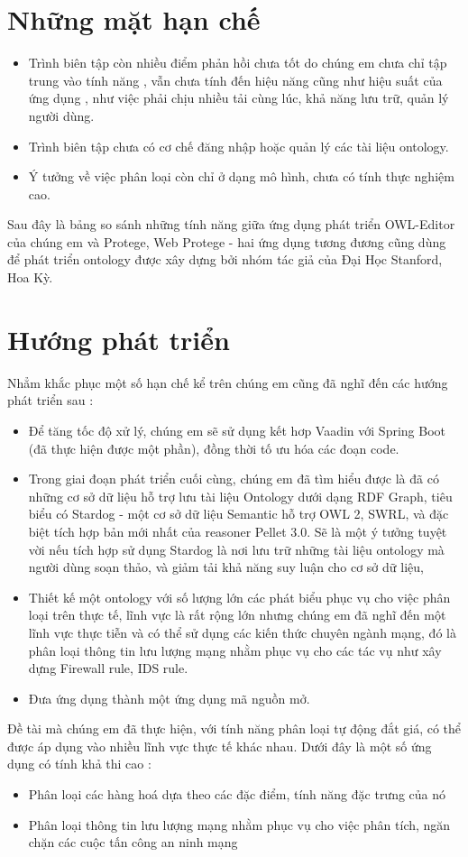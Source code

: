 \section{Những mặt hạn chế}
\begin{itemize}
\item Trình biên tập còn nhiều điểm phản hồi chưa tốt do chúng em chưa chỉ tập trung vào tính năng , vẫn chưa tính đến hiệu năng cũng như hiệu suất của ứng dụng , như việc phải chịu nhiều tải cùng lúc, khả năng lưu trữ, quản lý người dùng.
\item Trình biên tập chưa có cơ chế đăng nhập hoặc quản lý các tài liệu ontology.
\item Ý tưởng về việc phân loại còn chỉ ở dạng mô hình, chưa có tính thực nghiệm cao.
\end{itemize}
Sau đây là bảng so sánh những tính năng giữa ứng dụng phát triển OWL-Editor của chúng em và Protege, Web Protege - hai ứng dụng tương đương cũng dùng để phát triển ontology được xây dựng bởi nhóm tác giả của Đại Học Stanford, Hoa Kỳ.



\section{Hướng phát triển}
Nhẳm khắc phục một số hạn chế kể trên chúng em cũng đã nghĩ đến các hướng phát triển sau :
\begin{itemize}
\item Để tăng tốc độ xử lý, chúng em sẽ sử dụng kết hơp Vaadin với Spring Boot (đã thực hiện được một phần), đồng thời tố ưu hóa các đoạn code.
\item Trong giai đoạn phát triển cuối cùng, chúng em đã tìm hiểu được là đã có những cơ sở dữ liệu hỗ trợ lưu tài liệu Ontology dưới dạng RDF Graph, tiêu biểu có Stardog - một cơ sở dữ liệu Semantic hỗ trợ OWL 2, SWRL, và đặc biệt tích hợp bản mới nhất của reasoner Pellet 3.0. Sẽ là một ý tưởng tuyệt vời nếu tích hợp sử dụng Stardog là nơi lưu trữ những tài liệu ontology mà người dùng soạn thảo, và giảm tải khả năng suy luận cho cơ sở dữ liệu,
\item Thiết kế một ontology với số lượng lớn các phát biểu phục vụ cho việc phân loại trên thực tế, lĩnh vực là rất rộng lớn nhưng chúng em đã nghĩ đến một lĩnh vực thực tiễn và có thể sử dụng các kiến thức chuyên ngành mạng, đó là phân loại thông tin lưu lượng mạng nhằm phục vụ cho các tác vụ như xây dựng Firewall rule, IDS rule.
\item Đưa ứng dụng thành một ứng dụng mã nguồn mở.
\end{itemize}

Đề tài mà chúng em đã thực hiện, với tính năng phân loại tự động đắt giá, có thể được áp dụng vào nhiều lĩnh vực thực tế khác nhau. Dưới đây là một số ứng dụng có tính khả thi cao :
\begin{itemize}
\item Phân loại các hàng hoá dựa theo các đặc điểm, tính năng đặc trưng của nó
\item Phân loại thông tin lưu lượng mạng nhằm phục vụ cho việc phân tích, ngăn chặn các cuộc tấn công an ninh mạng
\end{itemize}
